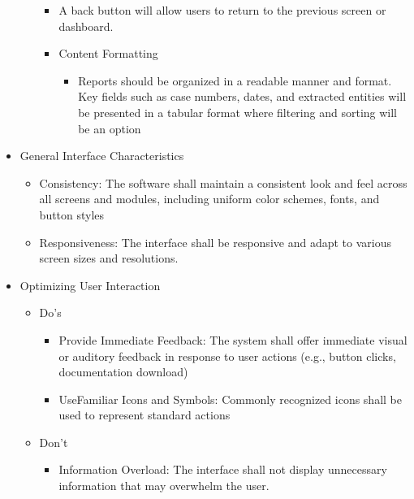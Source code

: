\documentclass[12pt]{article}
\begin{document}
\begin{itemize}
\begin{itemize}
\begin{itemize}
\begin{itemize}
			\end{itemize}
		\end{itemize}
		\begin{itemize}
			\item  A back button will allow users to return to the previous screen or dashboard.
		\end{itemize}
		\begin{itemize}
			\item  Content Formatting
			\begin{itemize}
				\item   Reports should be organized in a readable manner and format. Key fields such as case numbers, dates, and extracted entities will be presented in a tabular format where filtering and sorting will be an option	
			\end{itemize}
		\end{itemize}
	\end{itemize}
  \item General Interface Characteristics
	\begin{itemize}
		\item   Consistency: The software shall maintain a consistent look and feel across all screens and modules, including uniform color schemes, fonts, and button styles
		\item   Responsiveness: The interface shall be responsive and adapt to various screen sizes and resolutions.
	\end{itemize}
  \item Optimizing User Interaction
	\begin{itemize}
		\item   Do’s
		\begin{itemize}
			\item Provide Immediate Feedback: The system shall offer immediate visual or auditory feedback in response to user actions (e.g., button clicks, documentation download)
			\item  UseFamiliar Icons and Symbols: Commonly recognized icons shall be used to represent standard actions
		\end{itemize}

		\item   Don’t
		\begin{itemize}
			\item   Information Overload: The interface shall not display unnecessary information that may overwhelm the user.
		\end{itemize}
	\end{itemize}

\end{itemize}
\end{document}
